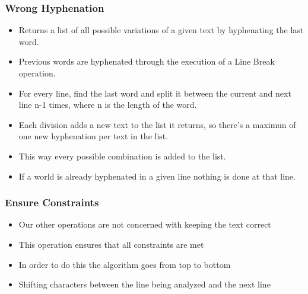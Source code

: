 \documentclass{beamer}
\begin{document}
\begin{frame}



\end{frame}


\begin{frame}
\frametitle{Wrong Hyphenation}
\begin{itemize}
\item Returns a list of all possible variations of a given text by hyphenating the last word.
\item Previous words are hyphenated through the execution of a Line Break operation.
\item For every line, find the last word and split it between the current and next line n-1 times, where n is the length of the word. 
\item Each division adds a new text to the list it returns, so there's a maximun of one new hyphenation per text in the list.
\item This way every possible combination is added to the list.
\item If a world is already hyphenated in a given line nothing is done at that line.
\end{itemize}
\end{frame}

\begin{frame}
\frametitle{Ensure Constraints}
\begin{itemize}
\item Our other operations are not concerned with keeping the text correct
\item This operation ensures that all constraints are met
\item In order to do this the algorithm goes from top to bottom
\item Shifting characters between the line being analyzed and the next line
	
\end{itemize}	
\end{frame}
\end{document}
